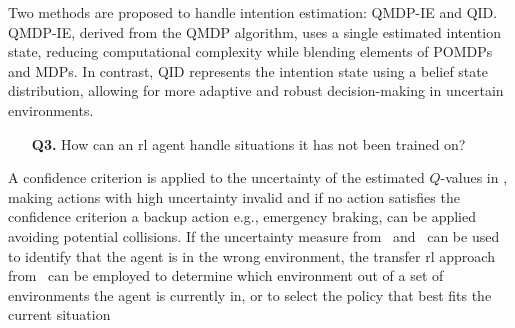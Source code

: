 Two methods are proposed to handle intention estimation: QMDP-IE and QID. QMDP-IE, derived from the QMDP algorithm, uses a single estimated intention state, reducing computational complexity while blending elements of POMDPs and MDPs. In contrast, QID represents the intention state using a belief state distribution, allowing for more adaptive and robust decision-making in uncertain environments.

\begin{enumerate}
	\item[\textbf{Q3.}] How can an \gls{rl} agent handle situations it has not been trained on? 
\end{enumerate}
A confidence criterion is applied to the uncertainty of the estimated $Q$-values in \paperEnsamble, making actions with high uncertainty invalid and if no action satisfies the confidence criterion a backup action e.g., emergency braking, can be applied avoiding potential collisions. If the uncertainty measure from \paperEnsamble \ and \paperBelief \ can be used to identify that the agent is in the wrong environment, the transfer \gls{rl} approach from \paperTransfer \ can be employed to determine which environment out of a set of environments the agent is currently in, or to select the policy that best fits the current situation



	
